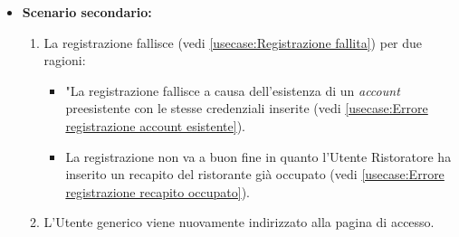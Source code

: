 \begin{itemize}
    \item \textbf{Scenario secondario:}
                \begin{enumerate}
                    \item La registrazione fallisce (vedi \autoref{usecase:Registrazione fallita}) per due ragioni:
                    \begin{itemize}
                        \item "La registrazione fallisce a causa dell'esistenza di un \textit{account} preesistente con le stesse credenziali inserite (vedi \autoref{usecase:Errore registrazione account esistente}).
                        \item La registrazione non va a buon fine in quanto l'Utente Ristoratore ha inserito un recapito del ristorante già occupato (vedi \autoref{usecase:Errore registrazione recapito occupato}).
                    \end{itemize}
                    \item L’Utente generico viene nuovamente indirizzato alla pagina di accesso.
                \end{enumerate}	
          
	
\end{itemize}


